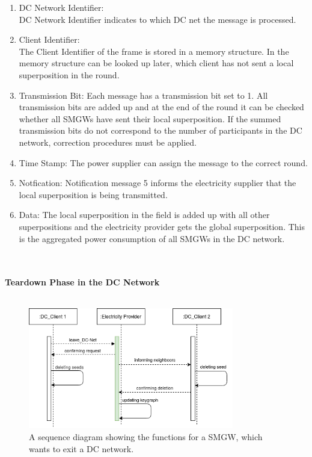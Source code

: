 \begin{enumerate}
\item DC Network Identifier:\\
DC Network Identifier indicates to which DC net the message is processed.
\item Client Identifier:\\
The Client Identifier of the frame is stored in a memory structure. In the memory structure can be looked up later, which client has not sent a local superposition in the round.
\item Transmission Bit: Each message has a transmission bit set to 1. All transmission bits are added up and at the end of the round it can be checked whether all SMGWs have sent their local superposition. If the summed transmission bits do not correspond to the number of participants in the DC network, correction procedures must be applied.
\item Time Stamp: The power supplier can assign the message to the correct round.
\item Notfication: Notification message 5 informs the electricity supplier that the local superposition is being transmitted.
\item Data:
The local superposition in the field is added up with all other superpositions and the electricity provider gets the global superposition. This is the aggregated power consumption of all SMGWs in the DC network.
\end{enumerate}
\\
\\
\textbf{Teardown Phase in the DC Network}
\\
\\
\begin{figure}[tbp]
  \centering
  \includegraphics[width=0.8\textwidth]{images/Exit.png}
  \caption[Sequence Diagram Exiting]{A sequence diagram showing the functions for a SMGW, which wants to exit a DC network.}
  \label{fig:Exit}
\end{figure}
